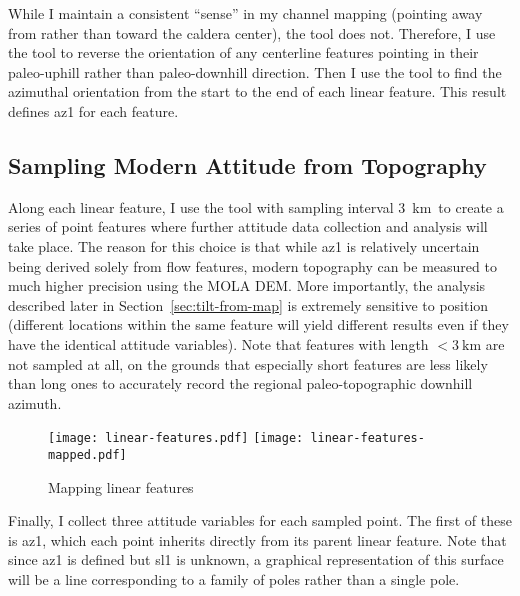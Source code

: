 While I maintain a consistent ``sense'' in my channel mapping (pointing away from rather than toward the caldera center), the  tool does not. Therefore, I use the  tool to reverse the orientation of any centerline features pointing in their paleo-uphill rather than paleo-downhill direction. Then I use the  tool to find the azimuthal orientation from the start to the end of each linear feature. This result defines \acf{az1} for each feature.

\subsection{Sampling Modern Attitude from Topography}

\newcommand{\samplinginterval}{\qty{3}{\km}}

Along each linear feature, I use the  tool with sampling interval \samplinginterval\ to create a series of point features where further attitude data collection and analysis will take place. The reason for this choice is that while \acf{az1} is relatively uncertain being derived solely from flow features, modern topography can be measured to much higher precision using the \ac{MOLA} \ac{DEM}. More importantly, the analysis described later in Section~\ref{sec:tilt-from-map} is extremely sensitive to position (different locations within the same feature will yield different results even if they have the identical attitude variables). Note that features with length $<\samplinginterval$ are not sampled at all, on the grounds that especially short features are less likely than long ones to accurately record the regional paleo-topographic downhill azimuth.

\begin{figure}
    \texttt{[image: linear-features.pdf]}
    \texttt{[image: linear-features-mapped.pdf]}
    \caption{Mapping linear features}%
    \label{fig:linear-features}
\end{figure}

\newcommand{\neighborhood}{\qty{2}{\km}}

Finally, I collect three attitude variables for each sampled point. The first  of these is \ac{az1}, which each point inherits directly from its parent linear feature. Note that since \ac{az1} is defined but \acf{sl1} is unknown, a graphical representation of this surface will be a line corresponding to a family of poles rather than a single pole.

